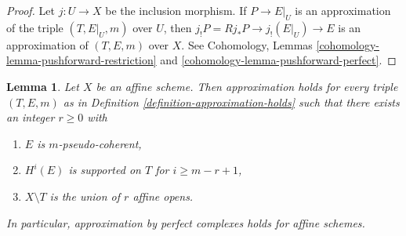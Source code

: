 \documentclass{stacks-project}
\theoremstyle{plain}
\newtheorem{lemma}[subsection]{Lemma}
\theoremstyle{definition}
\theoremstyle{remark}
\numberwithin{equation}{subsection}
\begin{document}
\begin{proof}
Let $j : U \to X$ be the inclusion morphism.
If $P \to E|_U$ is an approximation of the triple $(T, E|_U, m)$
over $U$, then $j_!P = Rj_*P \to j_!(E|_U) \to E$ is an approximation
of $(T, E, m)$ over $X$.
See Cohomology, Lemmas \ref{cohomology-lemma-pushforward-restriction} and
\ref{cohomology-lemma-pushforward-perfect}.
\end{proof}

\begin{lemma}
\label{lemma-approximation-affine}
Let $X$ be an affine scheme. Then approximation holds for every
triple $(T, E, m)$ as in Definition \ref{definition-approximation-holds}
such that there exists an integer $r \geq 0$ with
\begin{enumerate}
\item $E$ is $m$-pseudo-coherent,
\item $H^i(E)$ is supported on $T$ for $i \geq m - r + 1$,
\item $X \setminus T$ is the union of $r$ affine opens.
\end{enumerate}
In particular, approximation by perfect complexes holds for affine schemes.
\end{lemma}
\end{document}
